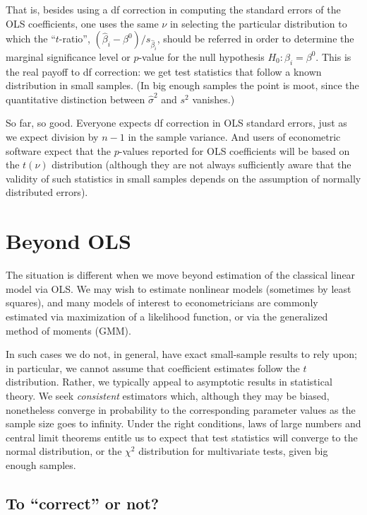 That is, besides using a df correction in computing the standard
errors of the OLS coefficients, one uses the same $\nu$ in selecting
the particular distribution to which the ``$t$-ratio'',
$(\hat{\beta}_i-\beta^0)/s_{\hat{\beta}_i}$, should be referred in
order to determine the marginal significance level or $p$-value for
the null hypothesis $H_0: \beta_i = \beta^0$.  This is the real
payoff to df correction: we get test statistics that follow a 
known distribution in small samples.  (In big enough samples
the point is moot, since the quantitative distinction between
$\hat\sigma^2$ and $s^2$ vanishes.)

So far, so good.  Everyone expects df correction in OLS standard
errors, just as we expect division by $n-1$ in the sample variance.
And users of econometric software expect that the $p$-values reported
for OLS coefficients will be based on the $t(\nu)$ distribution
(although they are not always sufficiently aware that the validity
of such statistics in small samples depends on the assumption
of normally distributed errors).

\section{Beyond OLS}

The situation is different when we move beyond estimation of
the classical linear model via OLS.  We may wish to estimate nonlinear
models (sometimes by least squares), and many models of interest to
econometricians are commonly estimated via maximization of a
likelihood function, or via the generalized method of moments (GMM).

In such cases we do not, in general, have exact small-sample results
to rely upon; in particular, we cannot assume that coefficient
estimates follow the $t$ distribution.  Rather, we typically appeal to
asymptotic results in statistical theory.  We seek \textit{consistent}
estimators which, although they may be biased, nonetheless converge in
probability to the corresponding parameter values as the sample size
goes to infinity.  Under the right conditions, laws of large numbers
and central limit theorems entitle us to expect that test statistics
will converge to the normal distribution, or the $\chi^2$ distribution
for multivariate tests, given big enough samples.

\subsection{To ``correct'' or not?}

